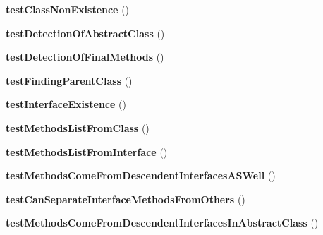 \begin{DoxyCompactItemize}
\item 
\hypertarget{class_test_of_reflection_ac5afd4886fe9f3ffd4cbc8327a85d88b}{
{\bfseries testClassNonExistence} ()}
\label{class_test_of_reflection_ac5afd4886fe9f3ffd4cbc8327a85d88b}

\item 
\hypertarget{class_test_of_reflection_af2a9f2153fadea3a8bc1097475c2d7da}{
{\bfseries testDetectionOfAbstractClass} ()}
\label{class_test_of_reflection_af2a9f2153fadea3a8bc1097475c2d7da}

\item 
\hypertarget{class_test_of_reflection_ad54ff942a6b3ad2ff4041fae354fdf33}{
{\bfseries testDetectionOfFinalMethods} ()}
\label{class_test_of_reflection_ad54ff942a6b3ad2ff4041fae354fdf33}

\item 
\hypertarget{class_test_of_reflection_a74fe47aa06210cf202a266bf215ac033}{
{\bfseries testFindingParentClass} ()}
\label{class_test_of_reflection_a74fe47aa06210cf202a266bf215ac033}

\item 
\hypertarget{class_test_of_reflection_a96e1324b4ed9b0779d332cfae05e530f}{
{\bfseries testInterfaceExistence} ()}
\label{class_test_of_reflection_a96e1324b4ed9b0779d332cfae05e530f}

\item 
\hypertarget{class_test_of_reflection_ace77cc08c4111db7164ea099b1bad867}{
{\bfseries testMethodsListFromClass} ()}
\label{class_test_of_reflection_ace77cc08c4111db7164ea099b1bad867}

\item 
\hypertarget{class_test_of_reflection_a492759c5772d912629687d62f0cb08fb}{
{\bfseries testMethodsListFromInterface} ()}
\label{class_test_of_reflection_a492759c5772d912629687d62f0cb08fb}

\item 
\hypertarget{class_test_of_reflection_af7427e439a89b65533a3da22896b470c}{
{\bfseries testMethodsComeFromDescendentInterfacesASWell} ()}
\label{class_test_of_reflection_af7427e439a89b65533a3da22896b470c}

\item 
\hypertarget{class_test_of_reflection_a43de194c8885dbe7fce737399621ccbd}{
{\bfseries testCanSeparateInterfaceMethodsFromOthers} ()}
\label{class_test_of_reflection_a43de194c8885dbe7fce737399621ccbd}

\item 
\hypertarget{class_test_of_reflection_a5527cfbaf76a8d13a27cc1e01057652b}{
{\bfseries testMethodsComeFromDescendentInterfacesInAbstractClass} ()}
\label{class_test_of_reflection_a5527cfbaf76a8d13a27cc1e01057652b}


\end{DoxyCompactItemize}
